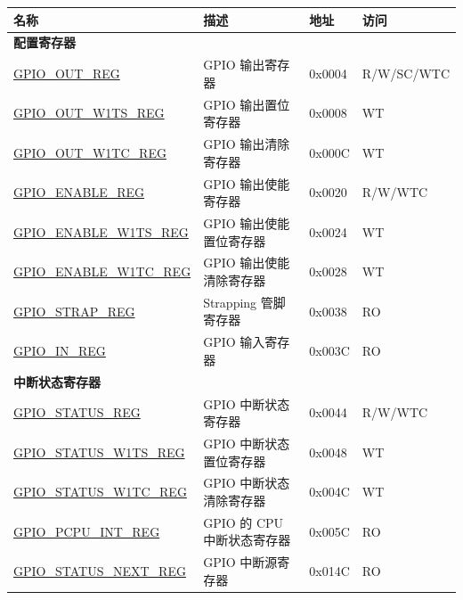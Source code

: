 \begin{longtable}{ | p{5.8cm} | p{7.2cm} | p{1.3cm} | p{2cm} | }
\hline\rowcolor{lightgray}
\textbf{名称} & \textbf{描述} & \textbf{地址} & \textbf{访问} \\ \hline
\endhead


\multicolumn{4}{|l|}{\textbf{配置寄存器}} \\ \hline

\hyperref[regdesc:GPIOOUTREG]{GPIO\_OUT\_REG} & GPIO 输出寄存器 & 0x0004 & R/W/SC/WTC \\ \hline
\hyperref[regdesc:GPIOOUTW1TSREG]{GPIO\_OUT\_W1TS\_REG} & GPIO 输出置位寄存器 & 0x0008 & WT \\ \hline
\hyperref[regdesc:GPIOOUTW1TCREG]{GPIO\_OUT\_W1TC\_REG} & GPIO 输出清除寄存器 & 0x000C & WT \\ \hline
\hyperref[regdesc:GPIOENABLEREG]{GPIO\_ENABLE\_REG} & GPIO 输出使能寄存器 & 0x0020 & R/W/WTC \\ \hline
\hyperref[regdesc:GPIOENABLEW1TSREG]{GPIO\_ENABLE\_W1TS\_REG} & GPIO 输出使能置位寄存器 & 0x0024 & WT \\ \hline
\hyperref[regdesc:GPIOENABLEW1TCREG]{GPIO\_ENABLE\_W1TC\_REG} & GPIO 输出使能清除寄存器 & 0x0028 & WT \\ \hline
\hyperref[regdesc:GPIOSTRAPREG]{GPIO\_STRAP\_REG} & Strapping 管脚寄存器 & 0x0038 & RO \\ \hline
\hyperref[regdesc:GPIOINREG]{GPIO\_IN\_REG} & GPIO 输入寄存器 & 0x003C & RO \\ \hline

\multicolumn{4}{|l|}{\textbf{中断状态寄存器}} \\ \hline
\hyperref[regdesc:GPIOSTATUSREG]{GPIO\_STATUS\_REG} & GPIO 中断状态寄存器 & 0x0044 & R/W/WTC \\ \hline
\hyperref[regdesc:GPIOSTATUSW1TSREG]{GPIO\_STATUS\_W1TS\_REG} & GPIO 中断状态置位寄存器 & 0x0048 & WT \\ \hline
\hyperref[regdesc:GPIOSTATUSW1TCREG]{GPIO\_STATUS\_W1TC\_REG} & GPIO 中断状态清除寄存器 & 0x004C & WT \\ \hline
\hyperref[regdesc:GPIOPCPUINTREG]{GPIO\_PCPU\_INT\_REG} & GPIO 的 CPU 中断状态寄存器 & 0x005C & RO \\ \hline

\hyperref[regdesc:GPIOSTATUSNEXTREG]{GPIO\_STATUS\_NEXT\_REG} & GPIO 中断源寄存器 & 0x014C & RO \\ \hline


\end{longtable}
